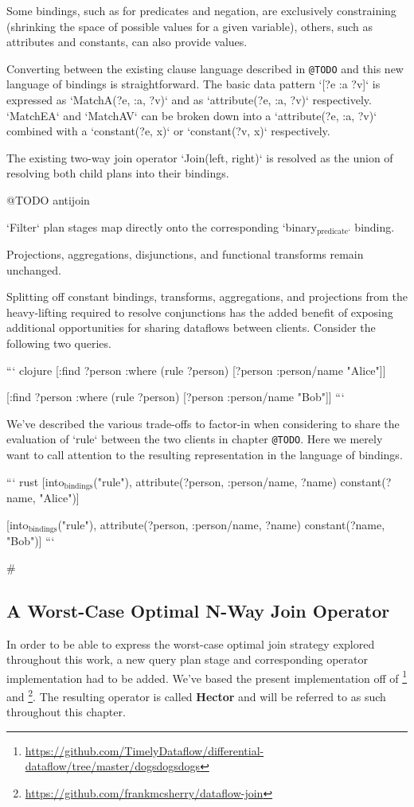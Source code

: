 \documentclass[../index.tex]{subfiles}
\begin{document}
Some bindings, such as for predicates and negation, are exclusively
constraining (shrinking the space of possible values for a given
variable), others, such as attributes and constants, can also provide
values.

Converting between the existing clause language described in \texttt{@TODO}
and this new language of bindings is straightforward. The basic data
pattern `[?e :a ?v]` is expressed as `MatchA(?e, :a, ?v)` and as
`attribute(?e, :a, ?v)` respectively. `MatchEA` and `MatchAV` can be
broken down into a `attribute(?e, :a, ?v)` combined with a
`constant(?e, x)` or `constant(?v, x)` respectively.

The existing two-way join operator `Join(left, right)` is resolved as
the union of resolving both child plans into their bindings.

@TODO antijoin

`Filter` plan stages map directly onto the corresponding
`binary$_{\text{predicate`}}$ binding.

Projections, aggregations, disjunctions, and functional transforms
remain unchanged.

Splitting off constant bindings, transforms, aggregations, and
projections from the heavy-lifting required to resolve conjunctions
has the added benefit of exposing additional opportunities for sharing
dataflows between clients. Consider the following two queries.

``` clojure
[:find ?person
:where
(rule ?person)
[?person :person/name "Alice"]]

[:find ?person
 :where
 (rule ?person)
 [?person :person/name "Bob"]]
```

We've described the various trade-offs to factor-in when considering
to share the evaluation of `rule` between the two clients in chapter
\texttt{@TODO}. Here we merely want to call attention to the resulting
representation in the language of bindings.

``` rust
[into$_{\text{bindings}}$("rule"),
 attribute(?person, :person/name, ?name)
 constant(?name, "Alice")]

[into$_{\text{bindings}}$("rule"),
 attribute(?person, :person/name, ?name)
 constant(?name, "Bob")] 
```

\#\subsection{A Worst-Case Optimal N-Way Join Operator}

In order to be able to express the worst-case optimal join strategy
explored throughout this work, a new query plan stage and
corresponding operator implementation had to be added. We've based the
present implementation off of \footnote{\url{https://github.com/TimelyDataflow/differential-dataflow/tree/master/dogsdogsdogs}} and \footnote{\url{https://github.com/frankmcsherry/dataflow-join}}. The resulting operator is
called \textbf{Hector} and will be referred to as such throughout this
chapter.
\end{document}

